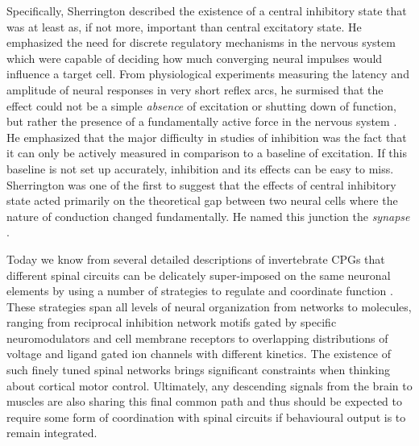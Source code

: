 Specifically, Sherrington described the existence of a central inhibitory state that was at least as, if not more, important than central excitatory state. He emphasized the need for discrete regulatory mechanisms in the nervous system which were capable of deciding how much converging neural impulses would influence a target cell. From physiological experiments measuring the latency and amplitude of neural responses in very short reflex arcs, he surmised that the effect could not be a simple \emph{absence} of excitation or shutting down of function, but rather the presence of a fundamentally active force in the nervous system \cite{Sherrington1965}. He emphasized that the major difficulty in studies of inhibition was the fact that it can only be actively measured in comparison to a baseline of excitation. If this baseline is not set up accurately, inhibition and its effects can be easy to miss. Sherrington was one of the first to suggest that the effects of central inhibitory state acted primarily on the theoretical gap between two neural cells where the nature of conduction changed fundamentally. He named this junction the \emph{synapse} \cite[p.929]{Foster1897}.

Today we know from several detailed descriptions of invertebrate CPGs that different spinal circuits can be delicately super-imposed on the same neuronal elements by using a number of strategies to regulate and coordinate function \cite{Orlovsky1999,Selverston2010}. These strategies span all levels of neural organization from networks to molecules, ranging from reciprocal inhibition network motifs gated by specific neuromodulators and cell membrane receptors to overlapping distributions of voltage and ligand gated ion channels with different kinetics. The existence of such finely tuned spinal networks brings significant constraints when thinking about cortical motor control. Ultimately, any descending signals from the brain to muscles are also sharing this final common path and thus should be expected to require some form of coordination with spinal circuits if behavioural output is to remain integrated.

